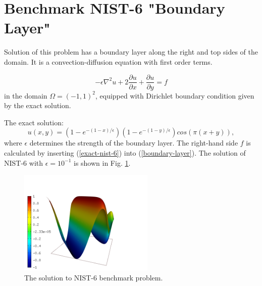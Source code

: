 \section{Benchmark NIST-6 "Boundary Layer"}
\label{sec:bench-6}

Solution of this problem has a boundary layer along the right and top sides of the domain.
It is a convection-diffusion equation with first order terms.

\begin{equation} \label{boundary-layer}
-\epsilon \nabla^{2} u + 2\frac{\partial u}{\partial x} + \frac{\partial u}{\partial y}= f
\end{equation}
in the domain $\Omega = (-1, 1)^2$, equipped with Dirichlet boundary condition
given by the exact solution.

The exact solution:
\begin{equation}\label{exact-nist-6}
u(x,y) = (1 - e^{-(1 - x) / \epsilon})(1 - e^{-(1 - y) / \epsilon})cos(\pi (x + y)),
\end{equation}
where $\epsilon$ determines the strength of the boundary layer.
The right-hand side $f$ is calculated by inserting (\ref{exact-nist-6}) into (\ref{boundary-layer}).
The solution of NIST-6 with $\epsilon = 10^{-1}$ is shown in Fig. \ref{fig:sln-nist06}.

\begin{figure}[!ht]
\centering
\includegraphics[height=5cm]{nist/nist-6/solution.png}
\caption{The solution to NIST-6 benchmark problem.}
\label{fig:sln-nist06}
\end{figure}

